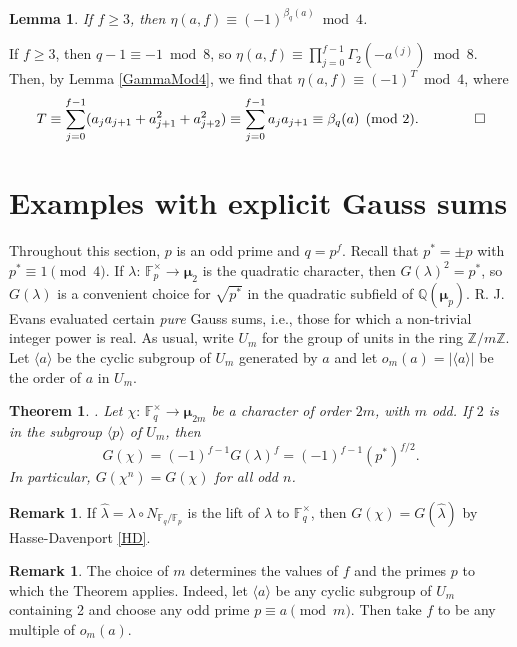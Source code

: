 \documentclass[12pt]{amsart}  \usepackage{amsmath,amssymb,enumerate,amscd,tikz,url}
\numberwithin{equation}{section}
\newtheorem{theorem}[equation]{Theorem}
\newtheorem{lemma}[equation]{Lemma}
\theoremstyle{definition}
\newtheorem{Rem}[equation]{Remark}
\newcommand{\F}{{\mathbb F}}
\newcommand{\Q}{{\mathbb Q}}
\newcommand{\Z}{{\mathbb Z}}
\newcommand{\Mu}{\boldsymbol \mu}
\newcommand{\lr}[1]{{\langle {#1} \rangle}}
\newcommand{\vv}[1]{{\left\vert {#1} \right\vert}}
\begin{document}
\begin{lemma}  \label{2AdicCong}
If $f \ge 3$, then $\eta(a,f) \equiv (-1)^{\beta_q(a)} \bmod{4}$.
\end{lemma}

\proof
If $f \ge 3$, then $q-1 \equiv -1 \bmod{8}$, so $\eta(a,f) \equiv \prod_{j=0}^{f-1} \Gamma_2(-a^{(j)}) \bmod{8}$.  Then, by Lemma \ref{GammaMod4}, we find that $\eta(a,f) \equiv (-1)^T \bmod{4}$, where
$$
T \equiv \sum_{j = 0}^{f-1} (a_j a_{j+1} + a_{j+1}^2 + a_{j+2}^2) \equiv \sum_{j = 0}^{f-1} a_j a_{j+1}  \equiv \beta_q(a) \pmod{2}.       \hspace{20 pt}   \qed
$$

\section{Examples with explicit Gauss sums} \label{Explicit}

Throughout this section, $p$ is an odd prime and $q = p^f$.   Recall that $p^* = \pm p$ with $p^* \equiv 1 \pmod{4}$.   If $\lambda\!: \, \F_p^\times \to \Mu_2$ is the quadratic character, then $G(\lambda)^2 = p^*$, so $G(\lambda)$ is a convenient choice for $\sqrt{p^*}$ in the quadratic subfield of $\Q(\Mu_p)$.  R. J. Evans evaluated certain {\em pure} Gauss sums, i.e., those for which a non-trivial integer power is real.  As usual, write $U_m$ for the group of units in the ring $\Z/m\Z$.  Let $\lr{a}$ be the cyclic subgroup of $U_m$ generated by $a$ and let $o_m(a) = \vv{\lr{a}}$ be the order of $a$ in $U_m$.  

\begin{theorem}\cite[Cor. 8]{Ev}.   \label{T:Gsum1}
Let $\chi\!: \, \F_q^\times \to \Mu_{2m}$ be a character of order $2m$, with $m$ odd.  If $2$ is in the subgroup $\lr{p}$ of $U_m$, then 
\[
	G(\chi) = (-1)^{f-1} G(\lambda)^f  = (-1)^{f-1}(p^{*})^{f/2}.
\]
In particular, $G(\chi^n) = G(\chi)$ for all odd $n$.
\end{theorem}

\begin{Rem}
If $\widehat{\lambda}  =  \lambda \circ N_{\F_q/\F_p}$ is the lift of $\lambda$ to $\F_q^\times$, then  $G(\chi) =  G(\widehat{\lambda})$ by Hasse-Davenport \eqref{HD}.
\end{Rem}

\begin{Rem}
The choice of $m$ determines the values of $f$ and the primes $p$ to which the Theorem applies.  Indeed, let $\lr{a}$ be any  cyclic subgroup of $U_m$ containing 2 and choose any odd prime $p \equiv a \pmod{m}$.  Then take $f$ to be any multiple of $o_m(a)$. 
\end{Rem}
\end{document}
